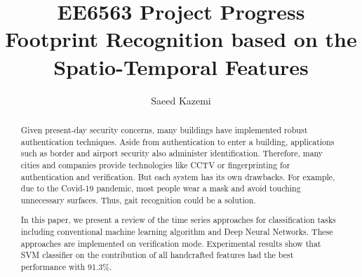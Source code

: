 \begin{frontmatter}
%
\title{\Huge EE6563 Project Progress\\ Footprint Recognition based on the\\ Spatio-Temporal Features }


\author{Saeed Kazemi}
\address{University of New Brunswick}


\begin{abstract}
Given present-day security concerns, many buildings have implemented robust authentication techniques. Aside from authentication to enter a building, applications such as border and airport security also administer identification. Therefore, many cities and companies provide technologies like CCTV or fingerprinting for authentication and verification. But each system has its own drawbacks. For example, due to the Covid-19 pandemic, most people wear a mask and avoid touching unnecessary surfaces. Thus, gait recognition could be a solution. 







In this paper, we present a review of the time series approaches for classification tasks including conventional machine learning algorithm and Deep Neural Networks. These approaches are implemented on verification mode. Experimental results show that SVM classifier on the contribution of all handcrafted features had the best performance with 91.3\%.




\end{abstract}
\end{frontmatter}
